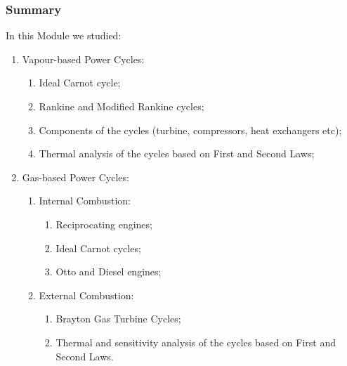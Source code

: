 \documentclass[10pt,compress]{beamer}
\begin{document}
\begin{frame}
 \frametitle{Summary}
  In this Module we studied:
  \begin{enumerate}
   \item<1-> Vapour-based Power Cycles:
    \begin{enumerate}
     \item<3-> Ideal Carnot cycle;
     \item<3-> Rankine and Modified Rankine cycles;
     \item<3-> Components of the cycles (turbine, compressors, heat exchangers etc);
     \item<3-> Thermal analysis of the cycles based on First and Second Laws;
    \end{enumerate}

   \item<2-> Gas-based Power Cycles:
    \begin{enumerate}
     \item<4-> Internal Combustion:
      \begin{enumerate}
       \item<6-> Reciprocating engines;
       \item<6-> Ideal Carnot cycles;
       \item<6-> Otto and Diesel engines;
      \end{enumerate}
     \item<5-> External Combustion:
        \begin{enumerate}
         \item<7-> Brayton Gas Turbine Cycles;
         \item<7-> Thermal and sensitivity analysis of the cycles based on First and Second Laws.
        \end{enumerate}
    \end{enumerate}      

  \end{enumerate}
\end{frame} 
\end{document}
